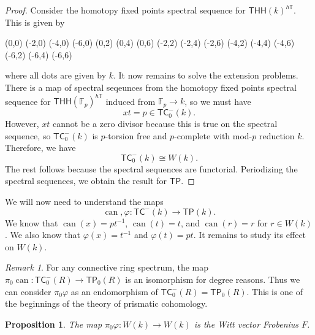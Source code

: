 \documentclass[10pt, oneside]{memoir}
\newtheorem{prop}[thm]{Proposition}
\theoremstyle{definition}
\theoremstyle{remark}
\newtheorem{rmk}[thm]{Remark}
\theoremstyle{plain}
\theoremstyle{definition}
\theoremstyle{remark}
\newcommand{\F}{\mathbb{F}}
\newcommand{\T}{\mathbb{T}}
\newcommand{\on}[1]{\operatorname{#1}}
\newcommand{\ms}[1]{\mathsf{#1}}
\newcommand{\1}{\mathbf{1}}
\newcommand{\2}{\mathbf{2}}
\newcommand{\3}{\mathbf{3}}
\newcommand{\THH}{\ms{THH}}
\newcommand{\TC}{\ms{TC}}
\newcommand{\TP}{\ms{TP}}
\begin{document}
\begin{proof}
    Consider the homotopy fixed points spectral sequence for \(\THH(k)^{h\T} \). This is given by
    \begin{center}
        \begin{sseqdata}[classes=fill, class labels={right=0.2em}, name=hfpk, homological Serre
            grading, xscale=1, y axis gap = 2em, axes type = frame] 
            \class["1"](0,0)
            \class["t"](-2,0)
            \class["t^2"](-4,0)
            \class["t^3"](-6,0)
            \class["x"](0,2) 
            \class["x^2"](0,4)
            \class["x^3"](0,6)
            \class(-2,2)
            \class(-2,4)
            \class(-2,6)
            \class(-4,2)
            \class(-4,4)
            \class(-4,6)
            \class(-6,2)
            \class(-6,4)
            \class(-6,6)
        \end{sseqdata} 
        \printpage[name=hfpk, page=2]
    \end{center}
    where all dots are given by \(k \). It now remains to solve the extension problems. There is a map of spectral seqeunces from the homotopy fixed points spectral sequence for \(\THH(\F_p)^{h\T} \) induced from \(\F_p \to k \), so we must have
    \[ xt = p \in \TC_0^-(k). \]
    However, \(xt \) cannot be a zero divisor because this is true on the spectral sequence, so \(\TC_0^-(k) \) is \(p \)-torsion free and \(p \)-complete with mod-\(p \) reduction \(k \). Therefore, we have
    \[ \TC_0^-(k) \cong W(k). \]
    The rest follows because the spectral sequences are functorial. Periodizing the spectral sequences, we obtain the result for \(\TP \).
\end{proof}

We will now need to understand the maps
\[ \on{can}, \varphi \colon \TC^-(k) \to \TP(k). \]
We know that \(\on{can}(x) = pt^{-1} \), \(\on{can}(t) = t \), and \(\on{can}(r) = r \) for \(r \in W(k) \). We also know that \(\varphi(x) = t^{-1} \) and \(\varphi(t) = pt \). It remains to study its effect on \(W(k) \).

\begin{rmk}
    For any connective ring spectrum, the map \(\pi_0 \on{can} \colon \TC_0^-(R) \to \TP_0(R) \) is an isomorphism for degree reasons. Thus we can consider \(\pi_0 \varphi \) as an endomorphism of \(\TC_0^-(R) = \TP_0(R) \). This is one of the beginnings of the theory of prismatic cohomology.
\end{rmk}

\begin{prop}
    The map \(\pi_0 \varphi \colon W(k) \to W(k) \) is the Witt vector Frobenius \(F \).
\end{prop}
\end{document}
